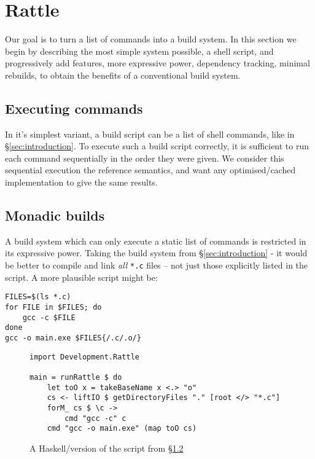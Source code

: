 \section{Rattle}
\label{sec:rattle}

Our goal is to turn a list of commands into a build system.  In this section we begin by describing the most simple system possible, a shell script, and progressively add features, more expressive power, dependency tracking, minimal rebuilds, to obtain the benefits of a conventional build system.


\subsection{Executing commands}

In it's simplest variant, a build script can be a list of shell commands, like in \S\ref{sec:introduction}.  To execute such a build script correctly, it is sufficient to run each command sequentially in the order they were given. We consider this sequential execution the reference semantics, and want any optimised/cached implementation to give the same results.

\subsection{Monadic builds}
\label{sec:monadic}

A build system which can only execute a static list of commands is restricted in its expressive power. Taking the build system from \S\ref{sec:introduction} - it would be better to compile and link \emph{all} \texttt{*.c} files -- not just those explicitly listed in the script. A more plausible script might be:

\begin{verbatim}
FILES=$(ls *.c)
for FILE in $FILES; do
    gcc -c $FILE
done
gcc -o main.exe $FILES{/.c/.o/}
\end{verbatim}

\begin{figure}
\begin{verbatim}
import Development.Rattle

main = runRattle $ do
    let toO x = takeBaseName x <.> "o"
    cs <- liftIO $ getDirectoryFiles "." [root </> "*.c"]
    forM_ cs $ \c ->
        cmd "gcc -c" c
    cmd "gcc -o main.exe" (map toO cs)
\end{verbatim}
\caption{A Haskell/\Rattle version of the script from \S\ref{sec:monadic}}
\label{fig:monadic}
\end{figure}


